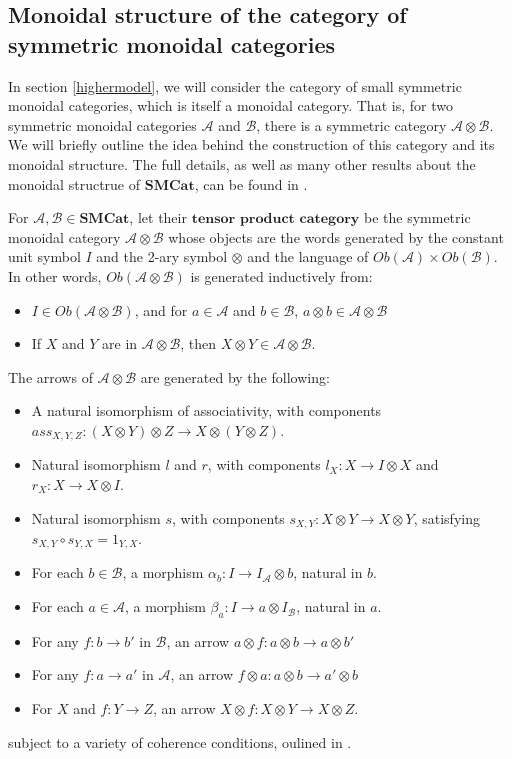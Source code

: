 \subsection{Monoidal structure of the category of symmetric monoidal categories}
In section \ref{highermodel}, we will consider the category of small symmetric monoidal categories, which is itself a monoidal category. That is, for two symmetric monoidal categories $\mathcal{A}$ and $\mathcal{B}$, there is a symmetric category $\mathcal{A} \otimes \mathcal{B}$. We will briefly outline the idea behind the construction of this category and its monoidal structure. The full details, as well as many other results about the monoidal structrue of $\mathbf{SMCat}$, can be found in \cite{smcat}.\\
\begin{defn}\label{smcatmon}
  For $\mathcal{A}, \mathcal{B} \in \mathbf{SMCat}$, let their $\textbf{tensor product category}$ be the symmetric monoidal category $\mathcal{A} \otimes \mathcal{B}$ whose objects are the words generated by the constant unit symbol $I$ and the 2-ary symbol $\otimes$ and the language of $Ob(\mathcal{A}) \times Ob(\mathcal{B})$. In other words, $Ob(\mathcal{A} \otimes \mathcal{B})$ is generated inductively from:
  \begin{itemize}
  \item $I \in Ob(\mathcal{A} \otimes \mathcal{B})$, and for $a \in \mathcal{A}$ and $b \in \mathcal{B}$, $a \otimes b \in \mathcal{A}\otimes\mathcal{B}$
  \item If $X$ and $Y$ are in $\mathcal{A} \otimes \mathcal{B}$, then $X \otimes Y \in \mathcal{A} \otimes \mathcal{B}$.
  \end{itemize}
  The arrows of $\mathcal{A} \otimes \mathcal{B}$ are generated by the following:
  \begin{itemize}
  \item A natural isomorphism of associativity, with components $ass_{X, Y, Z} : (X \otimes Y) \otimes Z \to X \otimes (Y \otimes Z)$.
  \item Natural isomorphism $l$ and $r$, with components $l_X : X \to I \otimes X$ and $r_X : X \to X \otimes I$.
  \item Natural isomorphism $s$, with components $s_{X, Y} : X \otimes Y \to X \otimes Y$, satisfying $s_{X, Y} \circ s_{Y, X} = 1_{Y, X}$.
  \item For each $b \in \mathcal{B}$, a morphism $\alpha_b : I \to I_{\mathcal{A}} \otimes b$, natural in $b$.
  \item For each $a \in \mathcal{A}$, a morphism $\beta_a : I \to a \otimes I_{\mathcal{B}}$, natural in $a$.
  \item For any $f : b \to b'$ in $\mathcal{B}$, an arrow $a \otimes f : a \otimes b \to a \otimes b'$
  \item For any $f : a \to a'$ in $\mathcal{A}$, an arrow $f \otimes a : a \otimes b \to a' \otimes b$
  \item For $X$ and $f : Y \to Z$, an arrow $X \otimes f : X \otimes Y \to X \otimes Z$.
  \end{itemize}
  subject to a variety of coherence conditions, oulined in \cite{smcat}.
\end{defn}
